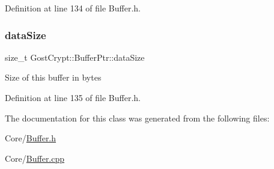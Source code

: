 Definition at line 134 of file Buffer.\+h.

\mbox{\label{class_gost_crypt_1_1_buffer_ptr_a63b4cbfd64f00015154f82a9376f5ca1}} 
\subsubsection{\texorpdfstring{data\+Size}{dataSize}}
{\footnotesize\ttfamily size\+\_\+t Gost\+Crypt\+::\+Buffer\+Ptr\+::data\+Size\hspace{0.3cm}{\ttfamily [protected]}}

Size of this buffer in bytes 

Definition at line 135 of file Buffer.\+h.



The documentation for this class was generated from the following files\+:\begin{DoxyCompactItemize}
\item 
Core/\hyperlink{_buffer_8h}{Buffer.\+h}\item 
Core/\hyperlink{_buffer_8cpp}{Buffer.\+cpp}\end{DoxyCompactItemize}
